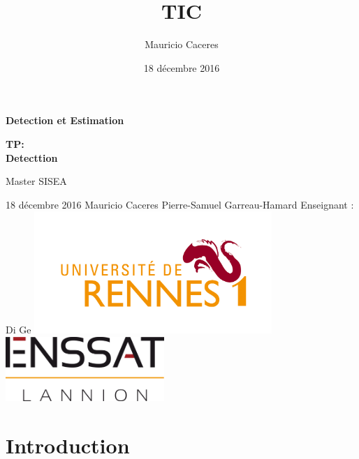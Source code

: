 \documentclass{report}
\title{TIC}
\author{Mauricio Caceres}
\date{18 décembre 2016}
\begin{document}
\begin{titlepage}
	\centering
	\vfill
{\bfseries\huge Detection et Estimation}
	\vfill
	{\bfseries\LARGE
		TP:\\
		Detecttion
		\\
		\vskip2cm

		Master SISEA\\
	
	}
	\vfill
	18 décembre 2016
	\vfill
	{\large Mauricio Caceres } \hfill  {\large Pierre-Samuel Garreau-Hamard}
	\vfill
	{\large Enseignant : Di Ge }
	\vfill
	\includegraphics[width=9cm]{rennes} %
	\vfill
	\includegraphics[width=6cm]{enssat} %
	\vfill
	\vfill
\end{titlepage}





\chapter{Introduction}
\end{document}
